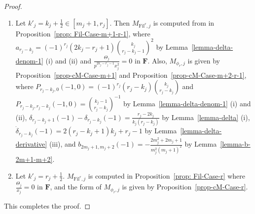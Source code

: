 \documentclass[11pt]{amsart}
\theoremstyle{definition}
\numberwithin{equation}{subsection}
\theoremstyle{plain}
\theoremstyle{plain}
\theoremstyle{plain}
\theoremstyle{plain}
\theoremstyle{plain}
\theoremstyle{plain}
\theoremstyle{plain}
\theoremstyle{plain}
\theoremstyle{plain}
\theoremstyle{plain}
\theoremstyle{plain}
\theoremstyle{plain}
\theoremstyle{definition}
\theoremstyle{definition}
\theoremstyle{definition}
\theoremstyle{remark}
\renewcommand{\(}{\textup{(}}
\renewcommand{\)}{\textup{)}}
\newcommand{\F}{\mathbf{F}}
\newcommand{\Fil}{\mathrm{Fil}}
\begin{document}
\begin{proof}
\begin{enumerate}[leftmargin=*]
\item Let $k'_j=k_j+\frac{1}{2}\in[m_j+1,r_j]$. Then $M_{\Fil^r,j}$ is computed from in Proposition~\ref{prop: Fil-Case-m+1-r-1}, where $a_{r_j-k_j}=(-1)^{r_j}(2k_j-r_j+1)\binom{k_j}{r_j-k_j-1}^2$ by Lemma~\ref{lemma-delta-denom-1} (i) and (ii) and $\frac{\Theta_j}{p^{2k_j-r_j-1}x_j^2}=0$ in $\F$. Also, $M_{\phi_r,j}$ is given by Proposition~\ref{prop-cM-Case-m+1} and Proposition~\ref{prop-cM-Case-m+2-r-1}, where $P_{r_j-k_j,0}(-1,0)=(-1)^{r_j}(r_j-k_j)\binom{k_j}{r_j-k_j}$ and $P_{r_j-k_j,r_j-k_j}(-1,0)=\binom{k_j-1}{r_j-k_j}^{-1}$ by Lemma~\ref{lemma-delta-denom-1} (i) and (ii), $\delta_{r_j-k_j+1}(-1)-\delta_{r_j-k_j}(-1)=\frac{r_j-2k_j}{k_j(r_j-k_j)}$ by Lemma~\ref{lemma-delta} (i), $\dot\delta_{r_j-k_j}(-1)=2(r_j-k_j+1)k_j+r_j-1$ by Lemma~\ref{lemma-delta-derivative} (iii), and $b_{2m_j+1,m_j+2}(-1)=-\frac{2m_j^2+2m_j+1}{m_j^2(m_j+1)^2}$ by Lemma~\ref{lemma-b-2m+1-m+2}.
\item Let $k'_j=r_j+\frac{1}{2}$. $M_{\Fil^r,j}$ is computed in Proposition~\ref{prop: Fil-Case-r} where $\frac{\Theta_j}{x_j}=0$ in $\F$, and the form of $M_{\phi_r,j}$ is given by Proposition~\ref{prop-cM-Case-r}. 
\end{enumerate}
This completes the proof.
\end{proof}
\end{document}
